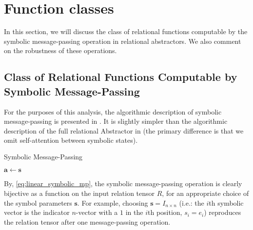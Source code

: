 \def\rdot{\bigcdot}
\def\F{{\mathfrak{F}}}

\section{Function classes}
\label{sec:function_spaces}

In this section, we will discuss the class of relational functions computable by the symbolic message-passing operation in relational abstractors. We also comment on the robustness of these operations.

\subsection{Class of Relational Functions Computable by Symbolic Message-Passing}
\label{ssec:function_class_symbolic_mp}
For the purposes of this analysis, the algorithmic description of symbolic message-passing is presented in . It is slightly simpler than the algorithmic description of the full relational Abstractor in  (the primary difference is that we omit self-attention between symbolic states).

\begin{algorithm}[h!]
	\caption{Symbolic Message-Passing}\label{alg:symbolic_mp}
	
	\vspace{1em}
	
	$\boldsymbol{a} \gets \boldsymbol{s}$
	
\end{algorithm}



By, \cref{eq:linear_symbolic_mp}, the symbolic message-passing operation is clearly bijective as a function on the input relation tensor $R$, for an appropriate choice of the symbol parameters $\boldsymbol{s}$. For example, choosing $\boldsymbol{s} = I_{n \times n}$ (i.e.: the $i$th symbolic vector is the indicator $n$-vector with a $1$ in the $i$th position, $s_i = e_i$) reproduces the relation tensor after one message-passing operation. 

